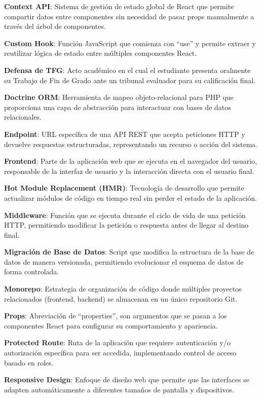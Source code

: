 \documentclass[12pt,a4paper,oneside]{report}
\begin{document}
\textbf{Context API}: Sistema de gestión de estado global de React que
permite compartir datos entre componentes sin necesidad de pasar props
manualmente a través del árbol de componentes.

\textbf{Custom Hook}: Función JavaScript que comienza con ``use'' y
permite extraer y reutilizar lógica de estado entre múltiples
componentes React.

\textbf{Defensa de TFG}: Acto académico en el cual el estudiante
presenta oralmente su Trabajo de Fin de Grado ante un tribunal evaluador
para su calificación final.

\textbf{Doctrine ORM}: Herramienta de mapeo objeto-relacional para PHP
que proporciona una capa de abstracción para interactuar con bases de
datos relacionales.

\textbf{Endpoint}: URL específica de una API REST que acepta peticiones
HTTP y devuelve respuestas estructuradas, representando un recurso o
acción del sistema.

\textbf{Frontend}: Parte de la aplicación web que se ejecuta en el
navegador del usuario, responsable de la interfaz de usuario y la
interacción directa con el usuario final.

\textbf{Hot Module Replacement (HMR)}: Tecnología de desarrollo que
permite actualizar módulos de código en tiempo real sin perder el estado
de la aplicación.

\textbf{Middleware}: Función que se ejecuta durante el ciclo de vida de
una petición HTTP, permitiendo modificar la petición o respuesta antes
de llegar al destino final.

\textbf{Migración de Base de Datos}: Script que modifica la estructura
de la base de datos de manera versionada, permitiendo evolucionar el
esquema de datos de forma controlada.

\textbf{Monorepo}: Estrategia de organización de código donde múltiples
proyectos relacionados (frontend, backend) se almacenan en un único
repositorio Git.

\textbf{Props}: Abreviación de ``properties'', son argumentos que se
pasan a los componentes React para configurar su comportamiento y
apariencia.

\textbf{Protected Route}: Ruta de la aplicación que requiere
autenticación y/o autorización específica para ser accedida,
implementando control de acceso basado en roles.

\textbf{Responsive Design}: Enfoque de diseño web que permite que las
interfaces se adapten automáticamente a diferentes tamaños de pantalla y
dispositivos.
\end{document}
